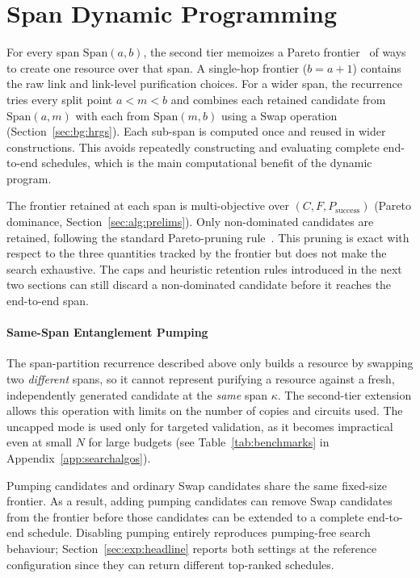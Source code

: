 \section{Span Dynamic Programming}
\label{sec:alg:dp}

For every span $\mathrm{Span}(a,b)$, the second tier memoizes a Pareto frontier~\cite{Pareto2014Manual} of ways to create one resource over that span. A single-hop frontier ($b=a+1$) contains the raw link and link-level purification choices. For a wider span, the recurrence tries every split point $a<m<b$ and combines each retained candidate from $\mathrm{Span}(a,m)$ with each from $\mathrm{Span}(m,b)$ using a Swap operation (Section~\ref{sec:bg:hrgs}). Each sub-span is computed once and reused in wider constructions. This avoids repeatedly constructing and evaluating complete end-to-end schedules, which is the main computational benefit of the dynamic program.

\clearpage

The frontier retained at each span is multi-objective over $(C,F,P_{\mathrm{success}})$ (Pareto dominance, Section~\ref{sec:alg:prelims}). Only non-dominated candidates are retained, following the standard Pareto-pruning rule~\cite{Ehrgott2005Multicriteria}. This pruning is exact with respect to the three quantities tracked by the frontier but does not make the search exhaustive. The caps and heuristic retention rules introduced in the next two sections can still discard a non-dominated candidate before it reaches the end-to-end span.

\vspace{0.7cm}

\paragraph{Same-Span Entanglement Pumping}
\label{sec:alg:pumping}

The span-partition recurrence described above only builds a resource by swapping two \emph{different} spans, so it cannot represent purifying a resource against a fresh, independently generated candidate at the \emph{same} span $\kappa$. The second-tier extension allows this operation with limits on the number of copies and circuits used. The uncapped mode is used only for targeted validation, as it becomes impractical even at small $N$ for large budgets (see Table~\ref{tab:benchmarks} in Appendix~\ref{app:searchalgos}).

Pumping candidates and ordinary Swap candidates share the same fixed-size frontier. As a result, adding pumping candidates can remove Swap candidates from the frontier before those candidates can be extended to a complete end-to-end schedule. Disabling pumping entirely reproduces pumping-free search behaviour; Section~\ref{sec:exp:headline} reports both settings at the reference configuration since they can return different top-ranked schedules.

